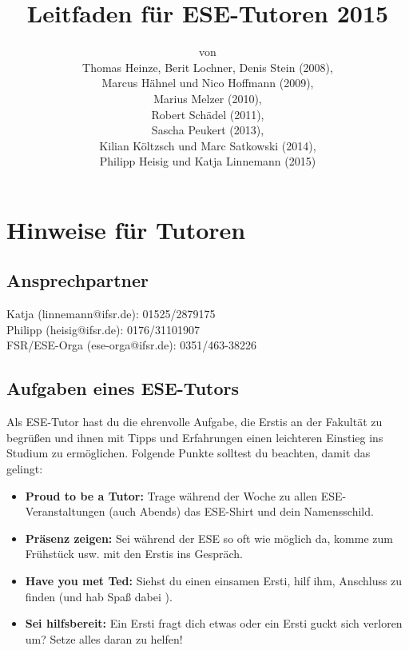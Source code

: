 \documentclass[a4paper,12pt]{report}
\begin{document}
\title{\textbf{Leitfaden für ESE-Tutoren 2015}\\}
\date{}
\author{von\\Thomas Heinze, Berit Lochner, Denis Stein (2008), \\Marcus Hähnel und Nico Hoffmann (2009), \\Marius Melzer (2010), \\Robert Schädel (2011),\\Sascha Peukert (2013), \\Kilian Költzsch und Marc Satkowski (2014), \\Philipp Heisig und Katja Linnemann (2015)}
\maketitle
\tableofcontents
\chapter{Hinweise für Tutoren}
\section{Ansprechpartner}
Katja (linnemann@ifsr.de): 01525/2879175\\
Philipp (heisig@ifsr.de): 0176/31101907 \\
FSR/ESE-Orga (ese-orga@ifsr.de): 0351/463-38226

\section{Aufgaben eines ESE-Tutors}
Als ESE-Tutor hast du die ehrenvolle Aufgabe, die Erstis an der Fakultät zu begrüßen und ihnen mit Tipps und Erfahrungen einen leichteren Einstieg ins Studium zu ermöglichen. Folgende Punkte solltest du beachten, damit das gelingt:
\begin{itemize}
	\item \textbf{Proud to be a Tutor:} Trage während der Woche zu allen ESE-Veranstaltungen (auch Abends) das ESE-Shirt und dein Namensschild.
	\item \textbf{Präsenz zeigen:} Sei während der ESE so oft wie möglich da, komme zum Frühstück usw. mit den Erstis ins Gespräch.
	\item \textbf{Have you met Ted:} Siehst du einen einsamen Ersti, hilf ihm, Anschluss zu finden (und hab Spaß dabei \Winkey ).
	\item \textbf{Sei hilfsbereit:} Ein Ersti fragt dich etwas oder ein Ersti guckt sich verloren um? Setze alles daran zu helfen!
\end{itemize}
\end{document}
